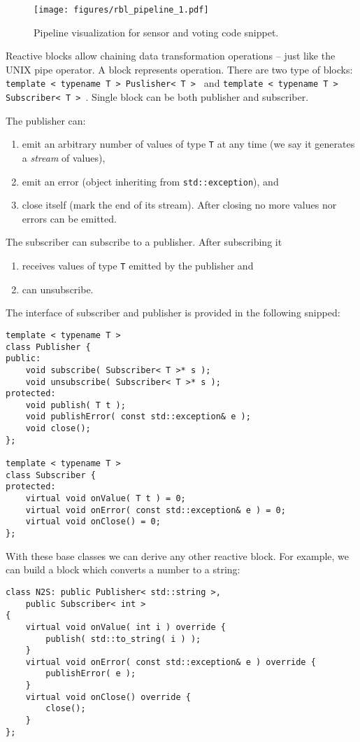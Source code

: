 \begin{figure}[!t]
    \centering
    \texttt{[image: figures/rbl\_pipeline\_1.pdf]}
    \caption{Pipeline visualization for sensor and voting code snippet.}
    \label{fig:rbl_example_1}
\end{figure}

Reactive blocks allow chaining data transformation operations -- just like the
UNIX pipe operator. A block represents operation. There are two type of
blocks: \texttt{template < typename T > Puslisher< T > }
and \texttt{template < typename T > Subscriber< T > }.
Single block can be both publisher and subscriber.

\noindent The publisher can:
\begin{enumerate}
    \item emit an arbitrary number of values of type \texttt{T} at any time (we
    say it generates a \emph{stream} of values),
    \item emit an error (object inheriting from
    \texttt{std::exception}), and
    \item close itself (mark the end of its stream). After closing no more
    values nor errors can be emitted.
\end{enumerate}

\noindent The subscriber can subscribe to a publisher. After subscribing it
\begin{enumerate}
    \item receives values of type \texttt{T} emitted by the publisher and
    \item can unsubscribe.
\end{enumerate}

The interface of subscriber and publisher is provided in the
following snipped:
\begin{verbatim}
template < typename T >
class Publisher {
public:
    void subscribe( Subscriber< T >* s );
    void unsubscribe( Subscriber< T >* s );
protected:
    void publish( T t );
    void publishError( const std::exception& e );
    void close();
};

template < typename T >
class Subscriber {
protected:
    virtual void onValue( T t ) = 0;
    virtual void onError( const std::exception& e ) = 0;
    virtual void onClose() = 0;
};
\end{verbatim}

With these base classes we can derive any other reactive block. For example, we
can build a block which converts a number to a string:
\begin{verbatim}
class N2S: public Publisher< std::string >,
    public Subscriber< int >
{
    virtual void onValue( int i ) override {
        publish( std::to_string( i ) );
    }
    virtual void onError( const std::exception& e ) override {
        publishError( e );
    }
    virtual void onClose() override {
        close();
    }
};
\end{verbatim}

